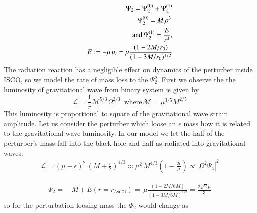 \documentclass[prd,preprintnumbers,onecolumn,eqsecnum,floatfix,letter]{revtex4}
\begin{document}
\begin{align}
	\Psi_{2}  = \Psi^{(0)}_{2} + 	\Psi^{(1)}_{2} \nonumber \\
	 \, \Psi^{(0)}_{2}  = M\,\rho^{3} \, \nonumber \\ \text{and} \, \Psi^{(1)}_{2}  = \frac{E}{r^{3}},\\ \space E := -\mu\, u_{t} = \mu\frac{(1- 2 M/r_{0})}{(1- 3M/r_{0})^{1/2}}
\end{align}
The radiation reaction has a negligible effect on dynamics of the perturber inside ISCO, so we model the rate of mass loss to the $\Psi^{o}_{2}$. First we observe  the the luminosity of gravitational wave from binary system is given by
\begin{equation}
	\mathcal{L} = \frac{1}{r}\mathcal{M}^{5/3}\Omega^{2/3} \, \text{ where} \, \mathcal{M} = \mu^{3/5}M^{2/5}
\end{equation}
This luminosity is proportional to square of the gravitational wave strain amplitude. Let us consider the perturber which loose an $\epsilon$ mass how it is related to the gravitational wave luminosity. In our model we let the half of the perturber's mass fall into the black hole and half as radiated into gravitational waves.  
\begin{align}
	\mathcal{L} = (\mu-\epsilon)^{2}\,(M+\frac{\epsilon}{2})^{4/3} \approx \mu^{2}\,M^{4/3}\left(1- \frac{2\epsilon}{\mu}\right) \propto |\Omega^{2}\Psi_{4}|^{2}
\end{align}

\begin{align}
	\Psi_{2} = & \, M + E(r = r_{ISCO}) = \, \mu\frac{(1-2M/6M)}{(1-3M/6M)^{1/2}} = \frac{2\sqrt{2}\mu}{3}
\end{align}
so for the perturbation loosing mass the  $\Psi_{2}$ would change as
\end{document}
